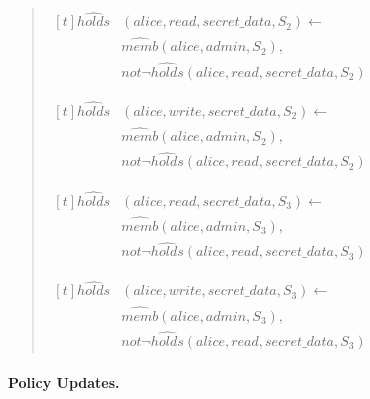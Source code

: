 \documentclass[10pt, twocolumn]{article}
\begin{document}
\begin{quote}
            \begin{math}
              \begin{aligned}[t]
                \hat{holds}&(alice, read, secret\_data, S_{2}) \leftarrow \\
                 & \hat{memb}(alice, admin, S_{2}), \\
                 & not \lnot \hat{holds}(alice, read, secret\_data, S_{2})
              \end{aligned}
            \end{math}

            \begin{math}
              \begin{aligned}[t]
                \hat{holds}&(alice, write, secret\_data, S_{2}) \leftarrow \\
                 & \hat{memb}(alice, admin, S_{2}), \\
                 & not \lnot \hat{holds}(alice, read, secret\_data, S_{2})
              \end{aligned}
            \end{math}

            \begin{math}
              \begin{aligned}[t]
                \hat{holds}&(alice, read, secret\_data, S_{3}) \leftarrow \\
                 & \hat{memb}(alice, admin, S_{3}), \\
                 & not \lnot \hat{holds}(alice, read, secret\_data, S_{3})
              \end{aligned}
            \end{math}

            \begin{math}
              \begin{aligned}[t]
                \hat{holds}&(alice, write, secret\_data, S_{3}) \leftarrow \\
                 & \hat{memb}(alice, admin, S_{3}), \\
                 & not \lnot \hat{holds}(alice, read, secret\_data, S_{3})
              \end{aligned}
            \end{math}

          \end{quote}

        \paragraph{Policy Updates.}
\end{document}
